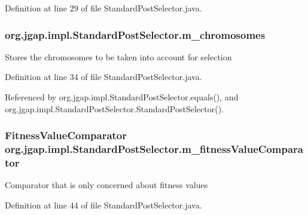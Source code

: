 Definition at line 29 of file Standard\-Post\-Selector.\-java.

\hypertarget{classorg_1_1jgap_1_1impl_1_1_standard_post_selector_a39fe9580f3b6623f01543e682947f405}{
\subsubsection[{m\-\_\-chromosomes}]{ org.\-jgap.\-impl.\-Standard\-Post\-Selector.\-m\-\_\-chromosomes\hspace{0.3cm}{\ttfamily [private]}}}\label{classorg_1_1jgap_1_1impl_1_1_standard_post_selector_a39fe9580f3b6623f01543e682947f405}
Stores the chromosomes to be taken into account for selection 

Definition at line 34 of file Standard\-Post\-Selector.\-java.



Referenced by org.\-jgap.\-impl.\-Standard\-Post\-Selector.\-equals(), and org.\-jgap.\-impl.\-Standard\-Post\-Selector.\-Standard\-Post\-Selector().

\hypertarget{classorg_1_1jgap_1_1impl_1_1_standard_post_selector_a979669fdbcfd1a4b0a0281de93cf734b}{
\subsubsection[{m\-\_\-fitness\-Value\-Comparator}]{\setlength{\rightskip}{0pt plus 5cm}Fitness\-Value\-Comparator org.\-jgap.\-impl.\-Standard\-Post\-Selector.\-m\-\_\-fitness\-Value\-Comparator\hspace{0.3cm}{\ttfamily [private]}}}\label{classorg_1_1jgap_1_1impl_1_1_standard_post_selector_a979669fdbcfd1a4b0a0281de93cf734b}
Comparator that is only concerned about fitness values 

Definition at line 44 of file Standard\-Post\-Selector.\-java.



